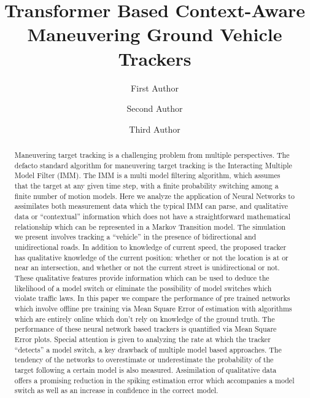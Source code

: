 \documentclass[runningheads]{llncs}
\begin{document}
%
\title{Transformer Based Context-Aware Maneuvering Ground Vehicle Trackers}
%
%
\author{First Author \and
Second Author \and
Third Author}
%
%
%
\maketitle              %
%
\begin{abstract}
Maneuvering target tracking is a challenging problem from multiple perspectives. The
defacto standard algorithm for maneuvering target tracking is the Interacting Multiple Model
Filter (IMM). The IMM is a multi model filtering algorithm, which assumes that the target at any given time step, with a finite
probability switching among a finite number of motion models.
Here we analyze the application of Neural Networks to assimilates both measurement
data which the typical IMM can parse, and qualitative data or “contextual” information which
does not have a straightforward mathematical relationship which can be represented in a
Markov Transition model. The simulation we present involves tracking a “vehicle” in the
presence of bidirectional and unidirectional roads. In addition to knowledge of current speed,
the proposed tracker has qualitative knowledge of the current position: whether or not the
location is at or near an intersection, and whether or not the current street is unidirectional or
not. These qualitative features provide information which can be used to deduce the likelihood
of a model switch or eliminate the possibility of model switches which violate traffic laws.
In this paper we compare the performance of pre trained networks which involve offline
pre training via Mean Square Error of estimation with algorithms which are entirely online
which don’t rely on knowledge of the ground truth. The performance of these neural network
based trackers is quantified via Mean Square Error plots. Special attention is given to analyzing
the rate at which the tracker “detects” a model switch, a key drawback of multiple model based
approaches. The tendency of the networks to overestimate or underestimate the probability of
the target following a certain model is also measured.
Assimilation of qualitative data offers a promising reduction in the spiking estimation
error which accompanies a model switch as well as an increase in confidence in the correct
model.

\end{abstract}
%
%
%
\end{document}
